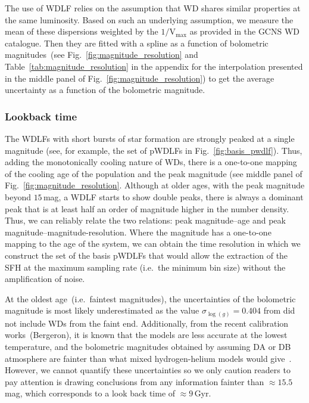 \documentclass[fleqn,usenatbib]{mnras}
\begin{document}
The use of WDLF relies on the assumption that WD shares similar properties
at the same luminosity. Based on such an underlying assumption, we measure
the mean of these dispersions weighted by the $1/\mathrm{V}_{\mathrm{max}}$
as provided in the GCNS WD catalogue. Then they are fitted with a spline as
a function of bolometric magnitudes~(see Fig.~\ref{fig:magnitude_resolution}
and Table~\ref{tab:magnitude_resolution} in the appendix for the interpolation
presented in the middle panel of Fig.~\ref{fig:magnitude_resolution}) to get
the average uncertainty as a function of the bolometric magnitude.

\subsubsection{Lookback time}
The WDLFs with short bursts of star formation are strongly peaked at a single
magnitude (see, for example, the set of pWDLFs in Fig.~\ref{fig:basis_pwdlf}).
Thus, adding the monotonically cooling nature of WDs, there is a one-to-one
mapping of the cooling age of the population and the peak magnitude (see middle
panel of Fig.~\ref{fig:magnitude_resolution}. Although at older ages, with the
peak magnitude beyond $15$\,mag, a WDLF starts to show double peaks, there is
always a dominant peak that is at least half an order of magnitude higher in
the number density. Thus, we can reliably relate the two relations: peak
magnitude--age and peak magnitude--magnitude-resolution. Where the magnitude
has a one-to-one mapping to the age of the system, we can obtain the time
resolution in which we construct the set of the basis pWDLFs that would allow
the extraction of the SFH at the maximum sampling rate (i.e.\ the minimum bin
size) without the amplification of noise.

At the oldest age~(i.e.\ faintest magnitudes), the uncertainties of the
bolometric magnitude is most likely underestimated as the value
$\sigma_{\log(g)} = 0.404$ from \citet{2014ApJ...796..128G} did not
include WDs from the faint end. Additionally, from the recent calibration
works~(Bergeron), it is known that the models are less accurate at the lowest 
temperature, and the bolometric magnitudes obtained by assuming DA or DB
atmosphere are fainter than what mixed hydrogen-helium models would
give~\citep{2022ApJ...934...36B}. However, we cannot quantify these uncertainties
so we only caution readers to pay attention is drawing conclusions from any
information fainter than $\approx15.5$\,mag, which corresponds to a look back
time of $\approx9$\,Gyr.
\end{document}
